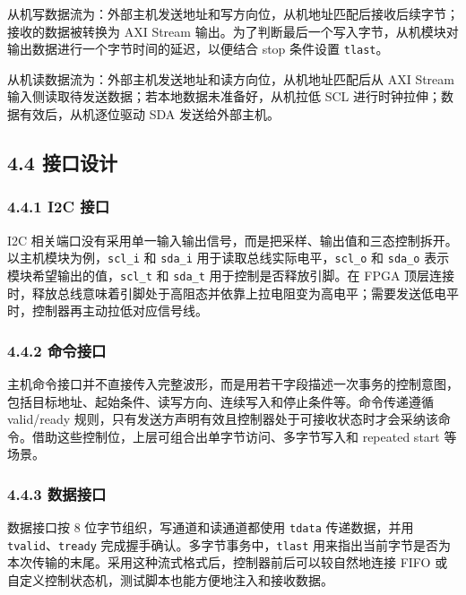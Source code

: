 从机写数据流为：外部主机发送地址和写方向位，从机地址匹配后接收后续字节；接收的数据被转换为
AXI Stream
输出。为了判断最后一个写入字节，从机模块对输出数据进行一个字节时间的延迟，以便结合
stop 条件设置 \texttt{tlast}。

从机读数据流为：外部主机发送地址和读方向位，从机地址匹配后从 AXI Stream
输入侧读取待发送数据；若本地数据未准备好，从机拉低 SCL
进行时钟拉伸；数据有效后，从机逐位驱动 SDA 发送给外部主机。

\subsection{4.4 接口设计}\label{ux63a5ux53e3ux8bbeux8ba1}

\subsubsection{4.4.1 I2C 接口}\label{i2c-ux63a5ux53e3}

I2C
相关端口没有采用单一输入输出信号，而是把采样、输出值和三态控制拆开。以主机模块为例，\texttt{scl\_i}
和 \texttt{sda\_i} 用于读取总线实际电平，\texttt{scl\_o} 和
\texttt{sda\_o} 表示模块希望输出的值，\texttt{scl\_t} 和 \texttt{sda\_t}
用于控制是否释放引脚。在 FPGA
顶层连接时，释放总线意味着引脚处于高阻态并依靠上拉电阻变为高电平；需要发送低电平时，控制器再主动拉低对应信号线。

\subsubsection{4.4.2 命令接口}\label{ux547dux4ee4ux63a5ux53e3}

主机命令接口并不直接传入完整波形，而是用若干字段描述一次事务的控制意图，包括目标地址、起始条件、读写方向、连续写入和停止条件等。命令传递遵循
valid/ready
规则，只有发送方声明有效且控制器处于可接收状态时才会采纳该命令。借助这些控制位，上层可组合出单字节访问、多字节写入和
repeated start 等场景。

\subsubsection{4.4.3 数据接口}\label{ux6570ux636eux63a5ux53e3}

数据接口按 8 位字节组织，写通道和读通道都使用 \texttt{tdata}
传递数据，并用 \texttt{tvalid}、\texttt{tready}
完成握手确认。多字节事务中，\texttt{tlast}
用来指出当前字节是否为本次传输的末尾。采用这种流式格式后，控制器前后可以较自然地连接
FIFO 或自定义控制状态机，测试脚本也能方便地注入和接收数据。


